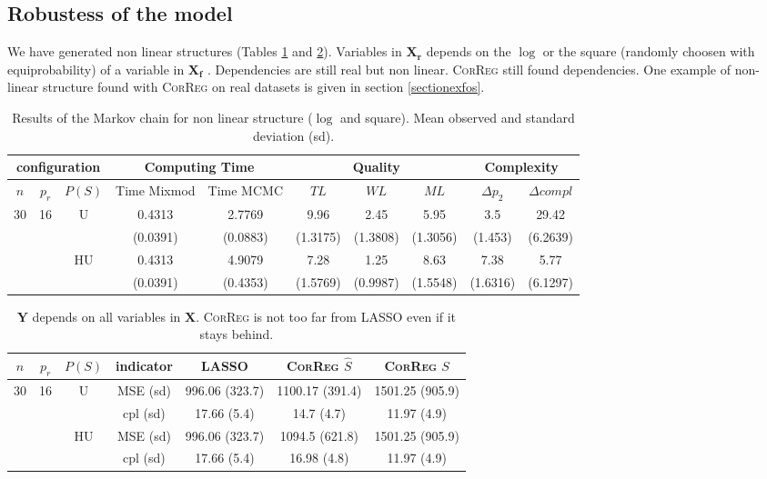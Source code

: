 \documentclass[11pt,a4paper]{article}
\begin{document}
\subsection{Robustess of the model}
 We have generated non linear structures (Tables \ref{compZnonlin} and \ref{resYnonlin}). Variables in $\boldsymbol{X_r}$ depends on the $\log$ or the square (randomly choosen with equiprobability) of a variable in $\boldsymbol{X_f}$ . Dependencies are still real but non linear. \textsc{CorReg} still found dependencies. One example of non-linear structure found with \textsc{CorReg} on real datasets is given in section \ref{sectionexfos}.
\begin{table}[h!]
\centering
\begin{tabular}{|c|c|c|c|c|c|c|c|c|c|}
\hline
\multicolumn{3}{|c}{configuration}  &  \multicolumn{2}{|c}{Computing Time}  & \multicolumn{3}{|c}{Quality} & \multicolumn{2}{|c|}{Complexity}\\
\hline
$n$ & $p_r$ & $P(S)$&Time Mixmod  & Time MCMC  & $TL$ & $WL$ & $ML$ & $\Delta p_2$ & $\Delta compl$ \\
\hline
30 & 16 & U& 0.4313 & 2.7769 & 9.96 & 2.45 & 5.95 & 3.5 & 29.42  \\
& & &(0.0391) & (0.0883) & (1.3175) & (1.3808) & (1.3056) & (1.453) & (6.2639) \\
 &  & HU & 0.4313 & 4.9079 & 7.28 & 1.25 & 8.63 & 7.38 & 5.77  \\ 
& & &(0.0391) & (0.4353) & (1.5769) & (0.9987) & (1.5548) & (1.6316) & (6.1297) \\ 
\hline
\end{tabular} 
\caption{Results of the Markov chain for non linear structure ($\log$ and square). Mean observed and standard deviation (sd). } \label{compZnonlin}
\end{table}


\begin{table}[h!]
\centering
\begin{tabular}{|c|c|c|c|c|c|c|}
\hline 
$n$ & $p_r$& $P(S)$ &indicator &LASSO  &    \textsc{CorReg} $\hat S$& \textsc{CorReg} $S$\\ 
\hline %
30 & 16 & U&MSE (sd) & 996.06 (323.7) & 1100.17 (391.4) & 1501.25 (905.9) \\
& & &cpl (sd) & 17.66 (5.4) & 14.7 (4.7) & 11.97 (4.9) \\
 &  &HU &MSE (sd) & 996.06 (323.7) & 1094.5 (621.8) & 1501.25 (905.9) \\
& & & cpl (sd) & 17.66 (5.4) & 16.98 (4.8) & 11.97 (4.9) \\ 
\hline
\end{tabular} 
\caption{ $\boldsymbol{Y}$ depends on all variables in $\boldsymbol{X}$. \textsc{CorReg} is not too far from LASSO even if it stays behind. } \label{resYnonlin}
\end{table}
\end{document}
